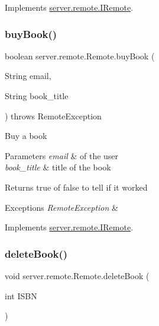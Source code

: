 Implements \hyperlink{interfaceserver_1_1remote_1_1_i_remote_a7d561f9f92fb53177f2d3e49e445148a}{server.\+remote.\+I\+Remote}.

\mbox{\label{classserver_1_1remote_1_1_remote_af5d1abb1730b8db14ab9dd476df158d8}} 
\subsubsection{\texorpdfstring{buy\+Book()}{buyBook()}}
{\footnotesize\ttfamily boolean server.\+remote.\+Remote.\+buy\+Book (\begin{DoxyParamCaption}\item[{String}]{email,  }\item[{String}]{book\+\_\+title }\end{DoxyParamCaption}) throws Remote\+Exception}

Buy a book 
\begin{DoxyParams}{Parameters}
{\em email} & of the user \\
\hline
{\em book\+\_\+title} & title of the book \\
\hline
\end{DoxyParams}
\begin{DoxyReturn}{Returns}
true of false to tell if it worked 
\end{DoxyReturn}

\begin{DoxyExceptions}{Exceptions}
{\em Remote\+Exception} & \\
\hline
\end{DoxyExceptions}


Implements \hyperlink{interfaceserver_1_1remote_1_1_i_remote_a5ecb918e7d2650346770f3ff5676c25b}{server.\+remote.\+I\+Remote}.

\mbox{\label{classserver_1_1remote_1_1_remote_a013ab36d40de824c6ad7a48f59d12684}} 
\subsubsection{\texorpdfstring{delete\+Book()}{deleteBook()}}
{\footnotesize\ttfamily void server.\+remote.\+Remote.\+delete\+Book (\begin{DoxyParamCaption}\item[{int}]{I\+S\+BN }\end{DoxyParamCaption})}

